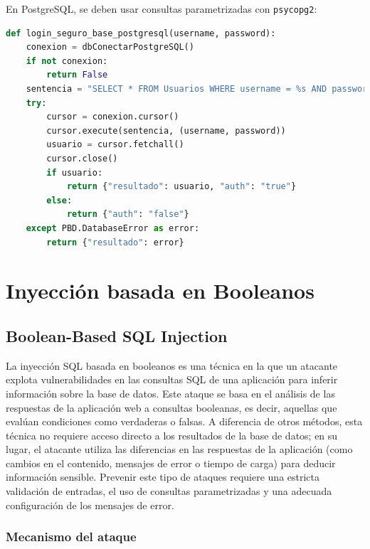 \documentclass[a4paper,12pt]{article}
\begin{document}
En PostgreSQL, se deben usar consultas parametrizadas con \texttt{psycopg2}:

\begin{lstlisting}[language=Python]
def login_seguro_base_postgresql(username, password):
    conexion = dbConectarPostgreSQL()
    if not conexion:
        return False
    sentencia = "SELECT * FROM Usuarios WHERE username = %s AND password = %s"
    try:
        cursor = conexion.cursor()
        cursor.execute(sentencia, (username, password))
        usuario = cursor.fetchall()
        cursor.close()
        if usuario:
            return {"resultado": usuario, "auth": "true"}
        else:
            return {"auth": "false"}
    except PBD.DatabaseError as error:
        return {"resultado": error}
\end{lstlisting}


\section{Inyección basada en Booleanos}
\subsection{Boolean-Based SQL Injection}

La inyección SQL basada en booleanos es una técnica en la que un atacante explota vulnerabilidades en las consultas SQL de una aplicación para inferir información sobre la base de datos. Este ataque se basa en el análisis de las respuestas de la aplicación web a consultas booleanas, es decir, aquellas que evalúan condiciones como verdaderas o falsas. A diferencia de otros métodos, esta técnica no requiere acceso directo a los resultados de la base de datos; en su lugar, el atacante utiliza las diferencias en las respuestas de la aplicación (como cambios en el contenido, mensajes de error o tiempo de carga) para deducir información sensible. Prevenir este tipo de ataques requiere una estricta validación de entradas, el uso de consultas parametrizadas y una adecuada configuración de los mensajes de error.

\subsubsection{Mecanismo del ataque}
\end{document}
